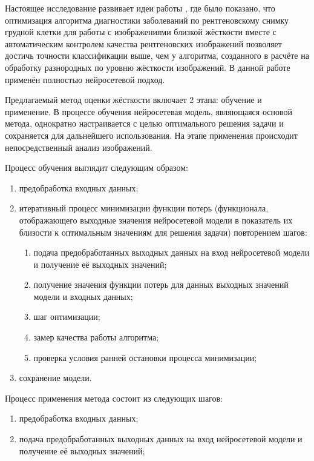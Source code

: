 Настоящее исследование развивает идеи работы \cite{dovganich2022automatic}, где было показано, что оптимизация алгоритма диагностики заболеваний по рентгеновскому снимку грудной клетки для работы с изображениями близкой жёсткости вместе с автоматическим контролем качества рентгеновских изображений позволяет достичь точности классификации выше, чем у алгоритма, созданного в расчёте на обработку разнородных по уровню жёсткости изображений. В данной работе применён полностью нейросетевой подход.

Предлагаемый метод оценки жёсткости включает 2 этапа: обучение и применение. В процессе обучения нейросетевая модель, являющаяся основой метода, однократно настраивается с целью оптимального решения задачи и сохраняется для дальнейшего использования. На этапе применения происходит непосредственный анализ изображений.

Процесс обучения выглядит следующим образом:

\begin{enumerate}
	\item предобработка входных данных;
	\item итеративный процесс минимизации функции потерь (функционала, отображающего выходные значения нейросетевой модели в показатель их близости к оптимальным значениям для решения задачи) повторением шагов:
	\begin{enumerate}
		\item подача предобработанных выходных данных на вход нейросетевой модели и получение её выходных значений;
		\item получение значения функции потерь для данных выходных значений модели и входных данных;
		\item шаг оптимизации;
		\item замер качества работы алгоритма;
		\item проверка условия ранней остановки процесса минимизации;
	\end{enumerate}
	\item сохранение модели.	
\end{enumerate}

Процесс применения метода состоит из следующих шагов:

\begin{enumerate}
	\item предобработка входных данных;
	\item подача предобработанных выходных данных на вход нейросетевой модели и получение её выходных значений;	
\end{enumerate}

